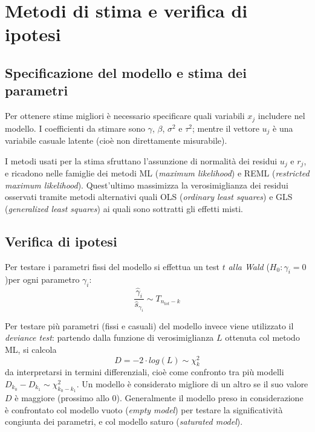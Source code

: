 \documentclass[a4page, 11pt]{article} %
\begin{document}
\section{Metodi di stima e verifica di ipotesi}
\subsection*{Specificazione del modello e stima dei parametri}
Per ottenere stime migliori è necessario specificare quali variabili $x_j$ includere nel modello.
I coefficienti da stimare sono $\gamma$, $\beta$, $\sigma^2$ e $\tau^2$; mentre il vettore $u_j$ è una variabile casuale latente (cioè non direttamente misurabile).

I metodi usati per la stima sfruttano l'assunzione di normalità dei residui $u_j$ e $r_j$, e ricadono nelle famiglie dei metodi ML (\textit{maximum likelihood}) e REML (\textit{restricted maximum likelihood}).
Quest'ultimo massimizza la verosimiglianza dei residui osservati tramite metodi alternativi quali OLS (\textit{ordinary least squares}) e GLS (\textit{generalized least squares}) ai quali sono sottratti gli effetti misti.

\subsection*{Verifica di ipotesi}
Per testare i parametri fissi del modello si effettua un test $t$ \textit{alla Wald} ($H_0: \gamma_i = 0$)per ogni parametro $\gamma_i$:
\begin{equation*}
  \frac{\hat{\gamma}_i}{\hat{s}_{\gamma_i}} \sim T_{n_{tot} - k}
\end{equation*}

Per testare più parametri (fissi e casuali) del modello invece viene utilizzato il \textit{deviance test}: partendo dalla funzione di verosimiglianza $L$ ottenuta col metodo ML, si calcola
\begin{equation*}
  D = -2 \cdot log(L) \sim \chi^2_k
\end{equation*}
da interpretarsi in termini differenziali, cioè come confronto tra più modelli $D_{k_0} - D_{k_1} \sim \chi^2_{k_0 - k_1} $.
Un modello è considerato migliore di un altro se il suo valore $D$ è maggiore (prossimo allo $0$).
Generalmente il modello preso in considerazione è confrontato col modello vuoto (\textit{empty model}) per testare la significatività congiunta dei parametri, e col modello saturo (\textit{saturated model}).
\end{document}
